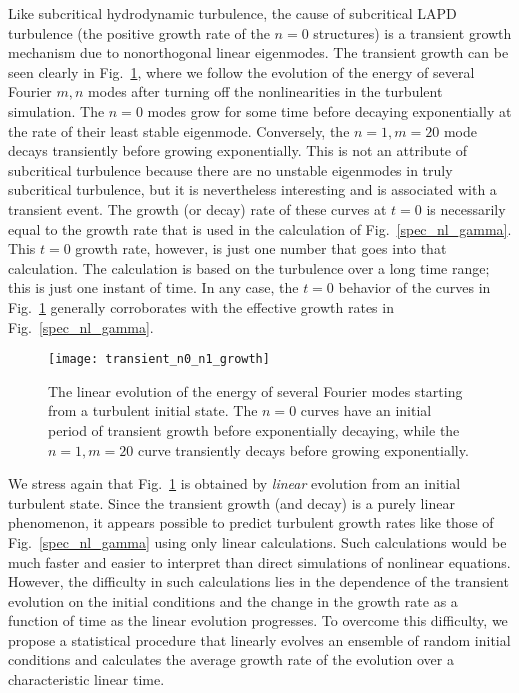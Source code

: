 \documentclass[showpacs,preprintnumbers,amsmath,amssymb,superscriptaddress,aip]{revtex4-1}
\begin{document}
Like subcritical hydrodynamic turbulence, the cause of subcritical LAPD turbulence (the positive growth rate of the $n=0$ structures) 
is a transient growth mechanism due to nonorthogonal linear eigenmodes. The transient growth can be seen clearly in Fig.~\ref{transient_n0_n1_growth},
where we follow the evolution of the energy of several Fourier $m,n$ modes after turning off the nonlinearities in the turbulent simulation. The $n=0$ modes grow for some time before decaying
exponentially at the rate of their least stable eigenmode. Conversely, the $n=1,m=20$ mode decays transiently before growing exponentially. This is not an attribute of subcritical turbulence
because there are no unstable eigenmodes in truly subcritical turbulence, but it is nevertheless interesting and is associated with a transient event.
The growth (or decay) rate of these curves at $t=0$ is necessarily equal to the growth rate that is used in the calculation of Fig.~\ref{spec_nl_gamma}. 
This $t=0$ growth rate, however, is just one number that goes into that calculation. The calculation is based on the turbulence over a long time range; this is just one instant of time.
In any case, the $t=0$ behavior of the curves in Fig.~\ref{transient_n0_n1_growth} generally corroborates with the effective growth rates in Fig.~\ref{spec_nl_gamma}.

\begin{figure}
\centerline{\texttt{[image: transient\_n0\_n1\_growth]}}
\caption{The linear evolution of the energy of several Fourier modes starting from a turbulent initial state. The $n=0$ curves have an initial period of transient growth before exponentially decaying,
while the $n=1,m=20$ curve transiently decays before growing exponentially.}
\label{transient_n0_n1_growth}
\end{figure}

We stress again that Fig.~\ref{transient_n0_n1_growth} is obtained by \emph{linear} evolution from an initial turbulent state.
Since the transient growth (and decay) is a purely linear phenomenon, it appears possible to predict turbulent growth rates like those of Fig.~\ref{spec_nl_gamma} using only linear calculations.
Such calculations would be much faster and easier to interpret than direct simulations of nonlinear equations. However, the difficulty in such calculations lies in the dependence of the transient
evolution on the initial conditions and the change in the growth rate as a function of time as the linear evolution progresses. To overcome this difficulty, we propose a statistical procedure
that linearly evolves an ensemble of random initial conditions and calculates the average growth rate of the evolution over a characteristic linear time.
\end{document}
